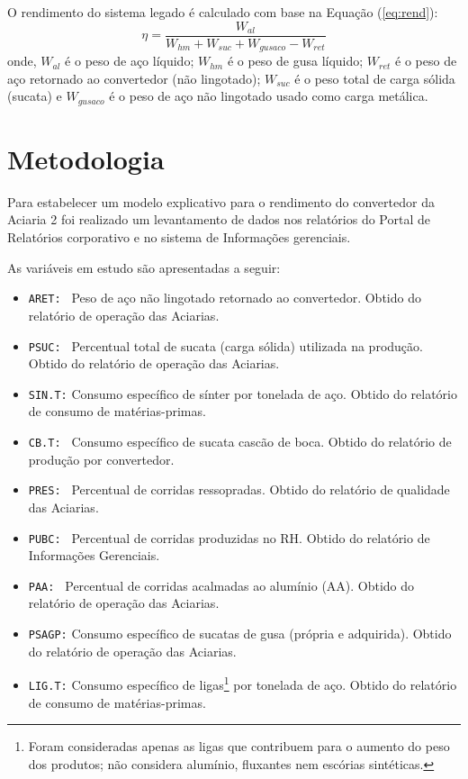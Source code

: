 \begin{multicols}{2}
	O rendimento do sistema legado é calculado com base na Equação (\ref{eq:rend}):
	\begin{equation}
		\label{eq:rend}
		\eta = \frac{W_{al}}{W_{hm}+W_{suc}+W_{gusaco}-W_{ret}} %
	\end{equation}
	\noindent onde, $W_{al}$ é o peso de aço líquido; $W_{hm}$ é o peso de gusa líquido; $W_{ret}$ é o peso de aço retornado ao convertedor (não lingotado); $W_{suc}$ é o peso total de carga sólida (sucata) e $W_{gusaco}$ é o peso de aço não lingotado usado como carga metálica. 
\section{Metodologia}
	Para estabelecer um modelo explicativo para o rendimento do convertedor da Aciaria 2 foi realizado um levantamento de dados nos relatórios do Portal de Relatórios corporativo\cite{rel13, rel2, rel4, rel16} e no sistema de Informações gerenciais\cite{igsu}.
	
	As variáveis em estudo são apresentadas a seguir:
		\begin{itemize} \itemsep4pt \parskip0pt 
			\item{\texttt{ARET: } Peso de aço não lingotado retornado ao convertedor. Obtido do relatório de operação das Aciarias\cite{rel2}.}
			\item{\texttt{PSUC: } Percentual total de sucata (carga sólida) utilizada na produção. Obtido do relatório de operação das Aciarias\cite{rel2}.}
			\item{\texttt{SIN.T:} Consumo específico de sínter por tonelada de aço. Obtido do relatório de consumo de matérias-primas\cite{rel16}.}
			\item{\texttt{CB.T: } Consumo específico de sucata cascão de boca. Obtido do relatório de produção por convertedor\cite{rel4}.}
			\item{\texttt{PRES: } Percentual de corridas ressopradas. Obtido do relatório de qualidade das Aciarias\cite{rel13}.}
			\item{\texttt{PUBC: } Percentual de corridas produzidas no RH. Obtido do relatório de Informações Gerenciais\cite{igsu}.}
			\item{\texttt{PAA:  } Percentual de corridas acalmadas ao alumínio (AA). Obtido do relatório de operação das Aciarias\cite{rel2}.}
			\item{\texttt{PSAGP:} Consumo específico de sucatas de gusa (própria e adquirida). Obtido do relatório de operação das Aciarias\cite{rel2}.}
			\item{\texttt{LIG.T:} Consumo específico de ligas\footnote{Foram consideradas apenas as ligas que contribuem para o aumento do peso dos produtos; não considera alumínio, fluxantes nem escórias sintéticas.} por tonelada de aço. Obtido do relatório de consumo de matérias-primas\cite{rel16}.}
		\end{itemize}
		

\end{multicols}
